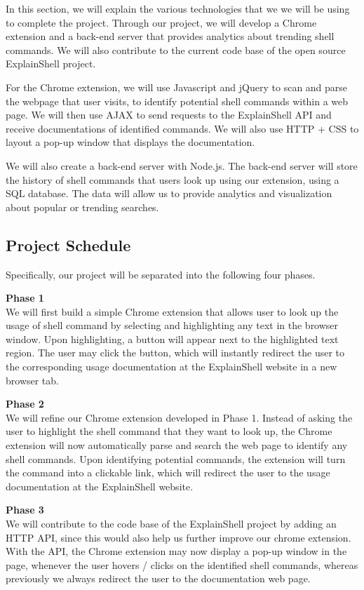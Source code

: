 \documentclass[11pt]{article}
\begin{document}
In this section, we will explain the various technologies that we we will be using to complete the project. Through our project, we will develop a Chrome extension and a back-end server that provides analytics about trending shell commands. We will also contribute to the current code base of the open source ExplainShell project. 

For the Chrome extension, we will use Javascript and jQuery to scan and parse the webpage that user visits, to identify potential shell commands within a web page. We will then use AJAX to send requests to the ExplainShell API and receive documentations of identified commands. We will also use HTTP + CSS to layout a pop-up window that displays the documentation. 

We will also create a back-end server with Node.js. The back-end server will store the history of shell commands that users look up using our extension, using a SQL database. The data will allow us to provide analytics and visualization about popular or trending searches.

\subsection{Project Schedule}
Specifically, our project will be separated into the following four phases. 

\par{\bf Phase 1}\\ 
We will first build a simple Chrome extension that allows user to look up the usage of shell command by selecting and highlighting any text in the browser window. Upon highlighting, a button will appear next to the highlighted text region. The user may click the button, which will instantly redirect the user to the corresponding usage documentation at the ExplainShell website in a new browser tab.

\par{\bf Phase 2}\\
We will refine our Chrome extension developed in Phase 1. Instead of asking the user to highlight the shell command that they want to look up, the Chrome extension will now automatically parse and search the web page to identify any shell commands. Upon identifying potential commands, the extension will turn the command into a clickable link, which will redirect the user to the usage documentation at the ExplainShell website.

\par{\bf Phase 3}\\
We will contribute to the code base of the ExplainShell project by adding an HTTP API, since this would also help us further improve our chrome extension. With the API, the Chrome extension may now display a pop-up window in the page, whenever the user hovers / clicks on the identified shell commands, whereas previously we always redirect the user to the documentation web page.
\end{document}
